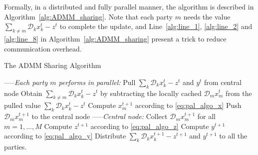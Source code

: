 Formally, in a distributed and fully parallel manner, the algorithm is described in Algorithm~\ref{alg:ADMM_sharing}. Note that each party $m$ needs the value $\sum_{k\neq m}\mathcal{D}_kx_k^{t} - z^{t}$ to complete the update, and Line~\ref{alg:line_1}, \ref{alg:line_2} and \ref{alg:line_8} in Algorithm~\ref{alg:ADMM_sharing} present a trick to reduce communication overhead.

\begin{algorithm}[t]
\caption{The ADMM Sharing Algorithm}
\begin{algorithmic}[1]
    \STATE -----\emph{Each party $m$ performs in parallel:}
        \STATE Pull  $\sum_k\mathcal{D}_kx_k^{t} - z^{t}$  and $y^{t}$ from central node \label{alg:line_1}
        \STATE Obtain $\sum_{k\neq m}\mathcal{D}_kx_k^{t} - z^{t}$ by subtracting the locally cached $\mathcal{D}_mx_m^{t}$ from  the pulled value $\sum_k\mathcal{D}_kx_k^{t} - z^{t}$ \label{alg:line_2}
        \STATE Compute $x_m^{t+1}$ according to \eqref{eq:pal_algo_x} \label{alg:line_3}
        \STATE Push $\mathcal{D}_mx_m^{t+1}$ to the central node \label{alg:line_4}
    \ENDFOR
    \STATE -----\emph{Central node:}
        \STATE Collect $\mathcal{D}_mx_m^{t+1}$ for all $m=1,\ldots,M$\label{alg:line_5}
        \STATE Compute $z^{t+1}$ according to \eqref{eq:pal_algo_z}\label{alg:line_6}
        \STATE Compute $y^{t+1}$ according to \eqref{eq:pal_algo_y}\label{alg:line_7}
        \STATE Distribute $\sum_k\mathcal{D}_kx_k^{t+1} - z^{t+1}$  and $y^{t+1}$ to all the parties. \label{alg:line_8}
    \ENDFOR
\end{algorithmic}
\label{alg:ADMM_sharing}
\end{algorithm}



